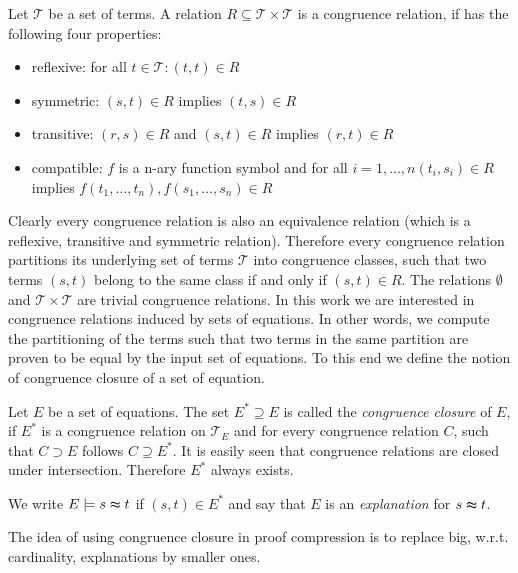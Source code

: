 \begin{definition}

Let $\mathcal{T}$ be a set of terms.
A relation $R \subseteq \mathcal{T} \times \mathcal{T}$ is a congruence relation, if has the following four properties:
\begin{itemize}
	\item reflexive: for all $t \in \mathcal{T}: (t,t) \in R$
	\item symmetric: $(s,t) \in R$ implies $(t,s) \in R$
	\item transitive: $(r,s) \in R$ and $(s,t) \in R$ implies $(r,t) \in R$
	\item compatible: $f$ is a n-ary function symbol and for all $i = 1,\ldots,n (t_i,s_i) \in R$ implies $f(t_1,\ldots,t_n),f(s_1,\ldots,s_n) \in R$
\end{itemize}

\end{definition}

Clearly every congruence relation is also an equivalence relation (which is a reflexive, transitive and symmetric relation).
Therefore every congruence relation partitions its underlying set of terms $\mathcal{T}$ into congruence classes, such that two terms $(s,t)$ belong to the same class if and only if $(s,t) \in R$.
The relations $\emptyset$ and $\mathcal{T} \times \mathcal{T}$ are trivial congruence relations.
In this work we are interested in congruence relations induced by sets of equations.
In other words, we compute the partitioning of the terms such that two terms in the same partition are proven to be equal by the input set of equations.
To this end we define the notion of congruence closure of a set of equation.

\begin{definition}

Let $E$ be a set of equations.
The set $E^* \supseteq E$ is called the \emph{congruence closure} of $E$, 
if $E^*$ is a congruence relation on $\mathcal{T}_E$ and for every congruence relation $C$, such that $C \supset E$ follows $C \supseteq E^*$.
It is easily seen that congruence relations are closed under intersection.
Therefore $E^*$ always exists.

\noindent We write $E \models s \thickapprox t$ if $(s,t) \in E^*$ and say that $E$ is an \emph{explanation} for $s \thickapprox t$.

\end{definition}

The idea of using congruence closure in proof compression is to replace big, w.r.t. cardinality, explanations by smaller ones.

